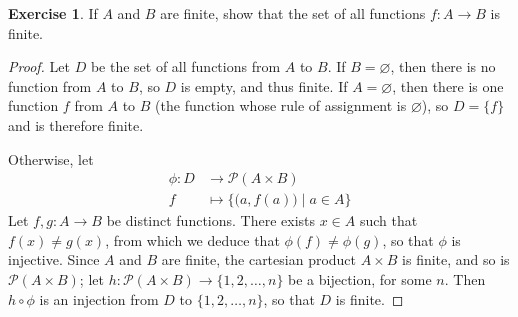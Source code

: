\documentclass[11pt,a4paper,twoside]{article}
\theoremstyle{definition}
\newcounter{excounter}
\newtheorem{exercise}[excounter]{Exercise}
\begin{document}
\begin{exercise}

  If $A$ and $B$ are finite, show that the set of all functions $f : A \to B$ is finite.

\end{exercise}

\begin{proof}

  Let $D$ be the set of all functions from $A$ to $B$.
  If $B = \varnothing$, then there is no function from $A$ to $B$, so $D$ is empty, and thus finite.
  If $A = \varnothing$, then there is one function $f$ from $A$ to $B$ (the function whose rule of assignment is $\varnothing$),
  so $D = \{ f \}$ and is therefore finite.

  Otherwise, let
  \begin{align*}
    \phi : D &\to \mathscr{P} (A \times B) \\
    f &\mapsto \big\{ \big(a, f (a) \big) \mid a \in A \big\}
  \end{align*}
  Let $f, g : A \to B$ be distinct functions. There exists $x \in A$ such that $f (x) \neq g (x)$, from which we deduce that
  $\phi (f) \neq \phi (g)$, so that $\phi$ is injective.
  Since $A$ and $B$ are finite, the cartesian product $A \times B$ is finite, and so is $\mathscr{P} (A \times B)$;
  let $h : \mathscr{P} (A \times B) \to \{ 1, 2, \dotsc, n \}$
  be a bijection, for some $n$. Then $h \circ \phi$ is an injection from $D$ to $\{ 1, 2, \dotsc, n \}$, so that $D$ is finite.

\end{proof}
\end{document}
